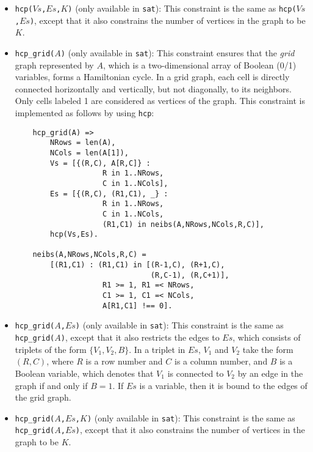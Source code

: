 \begin{itemize}
\item \texttt{hcp($Vs$,$Es$,$K$)} (only available in \texttt{sat}):  This constraint is the same as \texttt{hcp($Vs$,$Es$)}, except that it also constrains the number of vertices in the graph to be $K$. 

\item \texttt{hcp\_grid($A$)} (only available in \texttt{sat}):  This constraint ensures that the \textit{grid} graph represented by $A$, which is a two-dimensional array of Boolean (0/1) variables, forms a Hamiltonian cycle. In a grid graph, each cell is directly connected horizontally and vertically, but not diagonally, to its neighbors. Only cells labeled 1 are considered as vertices of the graph. This constraint is implemented as follows by using \texttt{hcp}:
\begin{verbatim}
    hcp_grid(A) =>
        NRows = len(A),
        NCols = len(A[1]),
        Vs = [{(R,C), A[R,C]} : 
                    R in 1..NRows, 
                    C in 1..NCols],
        Es = [{(R,C), (R1,C1), _} : 
                    R in 1..NRows, 
                    C in 1..NCols,
                    (R1,C1) in neibs(A,NRows,NCols,R,C)],
        hcp(Vs,Es).

    neibs(A,NRows,NCols,R,C) = 
        [(R1,C1) : (R1,C1) in [(R-1,C), (R+1,C), 
                               (R,C-1), (R,C+1)],
                    R1 >= 1, R1 =< NRows,
                    C1 >= 1, C1 =< NCols, 
                    A[R1,C1] !== 0].
\end{verbatim}

\item \texttt{hcp\_grid($A$,$Es$)} (only available in \texttt{sat}): This constraint is the same as \texttt{hcp\_grid($A$)}, except that it also restricts the edges to $Es$, which consists of triplets of the form $\{V_1,V_2,B\}$. In a triplet in $Es$, $V_1$ and $V_2$ take the form $(R,C)$, where $R$ is a row number and $C$ is a column number, and $B$ is a Boolean variable, which denotes that $V_1$ is connected to $V_2$  by an edge in the graph if and only if $B = 1$. If $Es$ is a variable, then it is bound to the edges of the grid graph.  

\item \texttt{hcp\_grid($A$,$Es$,$K$)} (only available in \texttt{sat}): This constraint is the same as\\ \texttt{hcp\_grid($A$,$Es$)}, except that it also constrains the number of vertices in the graph to be $K$. 


\end{itemize}
